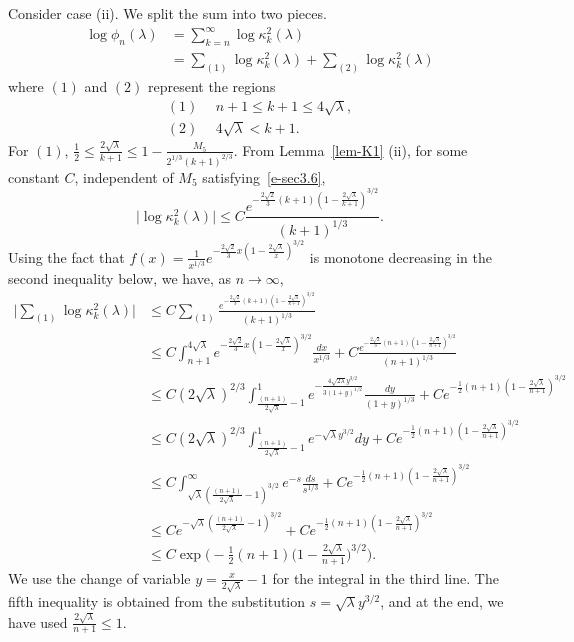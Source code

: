 \documentclass{amsart}
\theoremstyle{definition}
\theoremstyle{remark}
\numberwithin{equation}{section}
\begin{document}
\bigskip
Consider case (ii).
We split the sum into two pieces.
\begin{equation*}
   \begin{split}
      \log{\phi_n(\lambda)}
      &=\sum_{k=n}^{\infty} \log{\kappa^2_k}(\lambda)\\
      &=\sum_{(1)} \log{\kappa^2_{k}}(\lambda)
      + \sum_{(2)} \log{\kappa^2_{k}}(\lambda)
  \end{split}
\end{equation*}
where $(1)$ and $(2)$ represent the regions
\begin{align*}
  (1)\ \  &n+1\le k+1 \le 4\sqrt{\lambda},\\
  (2)\ \  &4\sqrt{\lambda} <k+1. 
\end{align*}
For $(1)$, $\frac12 \le \frac{2\sqrt{\lambda}}{k+1}\le
1-\frac{M_5}{2^{1/3}(k+1)^{2/3}}$.
From Lemma~\ref{lem-K1} (ii), for some constant $C$, independent of $M_5$ 
satisfying~\eqref{e-sec3.6},
\begin{equation*}
  \bigl| \log \kappa^2_k(\lambda) \bigr|
\le C\frac{ {e^{-\frac{2\sqrt{2}}{3}(k+1)
{(1-\frac{2\sqrt\lambda}{k+1})}^{3/2}}}}{{(k+1)}^{1/3}}.
\end{equation*}
Using the fact that 
$f(x)=\frac1{x^{1/3}}e^{-\frac{2\sqrt{2}}{3}x(1-\frac{2\sqrt{\lambda}}{x})^{3/2}}$ 
is monotone decreasing in the second inequality below, 
we have, as $n\to\infty$,  
\begin{equation}\label{e-z3}
  \begin{split}
    \bigl|\sum_{(1)} \log{\kappa^2_{k}}(\lambda) \bigr|
    &\le C\sum_{(1)} \frac{e^{-\frac{2\sqrt{2}}{3}(k+1)
(1-\frac{2\sqrt{\lambda}}{k+1})^{3/2}}}
{{(k+1)}^{1/3}}\\
    &\le C\int_{n+1}^{4\sqrt{\lambda}}
e^{-\frac{2\sqrt{2}}{3}x(1-\frac{2\sqrt{\lambda}}{x})^{3/2}}
\frac{dx}{x^{1/3}}
+C\frac{e^{-\frac{2\sqrt{2}}{3}(n+1)
(1-\frac{2\sqrt{\lambda}}{n+1})^{3/2}}}{{(n+1)}^{1/3}}\\
    &\le C(2\sqrt{\lambda})^{2/3}\int_{\frac{(n+1)}{2\sqrt{\lambda}}-1}^{1}
e^{-\frac{4\sqrt{2\lambda}y^{3/2}}{3(1+y)^{1/2}}}
\frac{dy}{(1+y)^{1/3}}
+Ce^{-\frac12(n+1)(1-\frac{2\sqrt{\lambda}}{n+1})^{3/2}}\\
    &\le C(2\sqrt{\lambda})^{2/3}\int_{\frac{(n+1)}{2\sqrt{\lambda}}-1}^{1}
e^{-\sqrt{\lambda}y^{3/2}} dy
+Ce^{-\frac12(n+1)(1-\frac{2\sqrt{\lambda}}{n+1})^{3/2}}\\
    &\le C\int_{\sqrt{\lambda}(\frac{(n+1)}{2\sqrt{\lambda}}-1)^{3/2}}^{\infty}
e^{-s}\frac{ds}{s^{1/3}}
+Ce^{-\frac12(n+1)(1-\frac{2\sqrt{\lambda}}{n+1})^{3/2}}\\
    &\le Ce^{-\sqrt{\lambda}(\frac{(n+1)}{2\sqrt{\lambda}}-1)^{3/2}}
+Ce^{-\frac12(n+1)(1-\frac{2\sqrt{\lambda}}{n+1})^{3/2}}\\
    &\le C\exp\biggl(-\frac12(n+1)
\bigl(1-\frac{2\sqrt{\lambda}}{n+1}\bigr)^{3/2}\biggr).
  \end{split}
\end{equation}
We use the change of variable $y=\frac{x}{2\sqrt{\lambda}}-1$ for 
the integral in the third line.
The fifth inequality is obtained from the substitution 
$s=\sqrt{\lambda}y^{3/2}$, 
and at the end, we have used $\frac{2\sqrt{\lambda}}{n+1} \le 1$.
\end{document}
